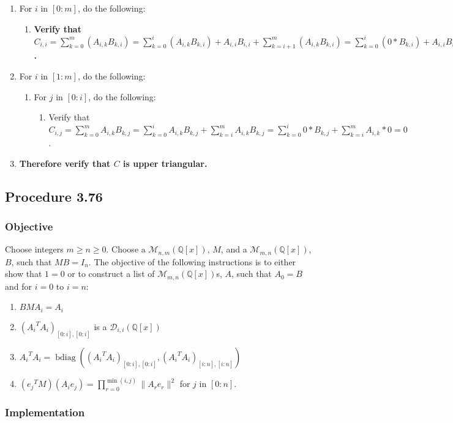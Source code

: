 \documentclass[twocolumn]{article}
\DeclareMathOperator{\bdiag}{bdiag}
\newcommand{\procedure}[2][]{\subsection*{Procedure #2 \ifthenelse{\equal{#1}{}}{}{(#1)}}\label{sec:procedure #2}}
\newcommand{\objective}{\subsubsection*{Objective}}
\newcommand{\implementation}{\subsubsection*{Implementation}}
\begin{document}
				\begin{enumerate}
					\item For $i$ in $[0:m]$, do the following:
					\begin{enumerate}
						\item \textbf{Verify that $C_{i,i}=\sum_{k=0}^m (A_{i,k}B_{k,i})=\sum_{k=0}^{i} (A_{i,k}B_{k,i})+A_{i,i}B_{i,i}+\sum_{k=i+1}^m (A_{i,k}B_{k,i})=\sum_{k=0}^{i} (0*B_{k,i})+A_{i,i}B_{i,i}+\sum_{k=i+1}^m (A_{i,k}*0)=A_{i,i}B_{i,i}$.}
					\end{enumerate}
					\item For $i$ in $[1:m]$, do the following:
					\begin{enumerate}
						\item For $j$ in $[0:i]$, do the following:
						\begin{enumerate}
							\item Verify that $C_{i,j}=\sum_{k=0}^m A_{i,k}B_{k,j}=\sum_{k=0}^{i} A_{i,k}B_{k,j}+\sum_{k=i}^m A_{i,k}B_{k,j}=\sum_{k=0}^{i} 0*B_{k,j}+\sum_{k=i}^m A_{i,k}*0=0$.
						\end{enumerate}
					\end{enumerate}
					\item \textbf{Therefore verify that $C$ is upper triangular.}
				\end{enumerate}
		\procedure{3.76}
			\objective
				Choose integers $m\ge n\ge 0$. Choose a $\mathcal{M}_{n,m}(\mathbb{Q}[x])$, $M$, and a $\mathcal{M}_{m,n}(\mathbb{Q}[x])$, $B$, such that $MB=I_n$. The objective of the following instructions is to either show that $1=0$ or to construct a list of $\mathcal{M}_{m,n}(\mathbb{Q}[x])$s, $A$, such that $A_0=B$ and for $i=0$ to $i=n$:
				\begin{enumerate}
					\item $BMA_i=A_i$
					\item $({A_i}^TA_i)_{[0:i],[0:i]}$ is a $\mathcal{D}_{i,i}(\mathbb{Q}[x])$
					\item ${A_i}^TA_i=\bdiag(({A_i}^TA_i)_{[0:i],[0:i]},\allowbreak({A_i}^TA_i)_{[i:n],[i:n]})$
					\item $({e_j}^TM)(A_ie_j)=\prod_{r=0}^{\min(i,j)}\lVert A_re_{r}\rVert^2$ for $j$ in $[0:n]$.
				\end{enumerate}
			\implementation
\end{document}

